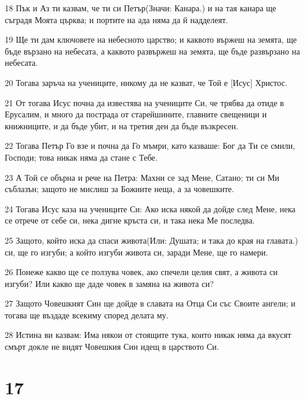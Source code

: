 \par 18 Пък и Аз ти казвам, че ти си Петър(Значи: Канара.) и на тая канара ще съградя Моята църква; и портите на ада няма да й надделеят.
\par 19 Ще ти дам ключовете на небесното царство; и каквото вържеш на земята, ще бъде вързано на небесата, а каквото развържеш на земята, ще бъде развързано на небесата.
\par 20 Тогава заръча на учениците, никому да не казват, че Той е [Исус] Христос.
\par 21 От тогава Исус почна да известява на учениците Си, че трябва да отиде в Ерусалим, и много да пострада от старейшините, главните свещеници и книжниците, и да бъде убит, и на третия ден да бъде възкресен.
\par 22 Тогава Петър Го взе и почна да Го мъмри, като казваше: Бог да Ти се смили, Господи; това никак няма да стане с Тебе.
\par 23 А Той се обърна и рече на Петра: Махни се зад Мене, Сатано; ти си Ми съблазън; защото не мислиш за Божиите неща, а за човешките.
\par 24 Тогава Исус каза на учениците Си: Ако иска някой да дойде след Мене, нека се отрече от себе си, нека дигне кръста си, и така нека Ме последва.
\par 25 Защото, който иска да спаси живота(Или: Душата; и така до края на главата.) си, ще го изгуби; а който изгуби живота си, заради Мене, ще го намери.
\par 26 Понеже какво ще се ползува човек, ако спечели целия свят, а живота си изгуби? Или какво ще даде човек в замяна на живота си?
\par 27 Защото Човешкият Син ще дойде в славата на Отца Си със Своите ангели; и тогава ще въздаде всекиму според делата му.
\par 28 Истина ви казвам: Има някои от стоящите тука, които никак няма да вкусят смърт докле не видят Човешкия Син идещ в царството Си.

\chapter{17}

